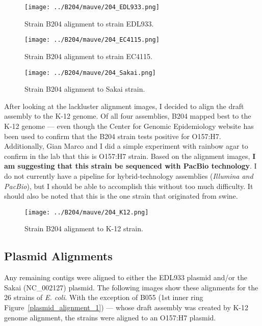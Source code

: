 \documentclass[11pt]{article}
\begin{document}
\begin{figure}[h!]\normalsize %
\centering
\texttt{[image: ../B204/mauve/204\_EDL933.png]}
\caption{Strain B204 alignment to strain EDL933.}
\label{alignment_EDL933}
\end{figure}

\begin{figure}[h!]\normalsize %
\centering
\texttt{[image: ../B204/mauve/204\_EC4115.png]}
\caption{Strain B204 alignment to strain EC4115.}
\label{alignment_EC4115}
\end{figure}

\begin{figure}[h!]\normalsize %
\centering
\texttt{[image: ../B204/mauve/204\_Sakai.png]}
\caption{Strain B204 alignment to Sakai strain.}
\label{alignment_Sakai}
\end{figure}

\clearpage

After looking at the lackluster alignment images, I decided to align the draft assembly to the K-12 genome. Of all four assemblies, B204 mapped best to the K-12 genome --- even though the Center for Genomic Epidemiology website has been used to confirm that the B204 strain tests positive for O157:H7. Additionally, Gian Marco and I did a simple experiment with rainbow agar to confirm in the lab that this is O157:H7 strain. Based on the alignment images, \textbf{I am suggesting that this strain be sequenced with PacBio technology}. I do not currently have a pipeline for hybrid-technology assemblies (\textit{Illumina and PacBio}), but I should be able to accomplish this without too much difficulty. It should also be noted that this is the one strain that originated from swine. 

\begin{figure}[h!]\normalsize %
\centering
\texttt{[image: ../B204/mauve/204\_K12.png]}
\caption{Strain B204 alignment to K-12 strain.}
\label{alignment_K12}
\end{figure}

\subsection*{Plasmid Alignments}
Any remaining contigs were aligned to either the EDL933 plasmid and/or the Sakai (NC\_002127) plasmid. The following images show these alignments for the 26 strains of \textit{E. coli}. With the exception of B055 (1st inner ring Figure~\ref{plasmid_alignment_1}) --- whose draft assembly was created by K-12 genome alignment, the strains were aligned to an O157:H7 plasmid. 
\end{document}
